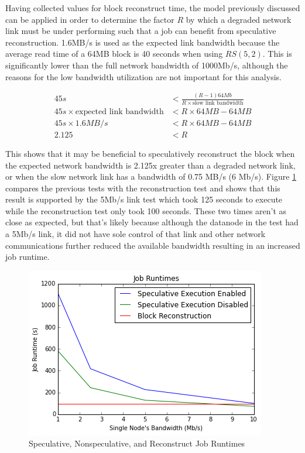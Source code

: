 \documentclass{ucetd}
\newcommand{\eqbegin}{\begin{equation*} \begin{aligned}}
\newcommand{\eqend}{\end{aligned} \end{equation*}}
\begin{document}
Having collected values for block reconstruct time, the model previously
discussed can be applied in order to determine the factor $R$ by which a
degraded network link must be under performing such that a job can benefit from
speculative reconstruction. 1.6MB/s is used as the expected link
bandwidth because the average read time of a 64MB block is 40 seconds when using
$RS(5,2)$. This is significantly lower than the full network bandwidth of
1000Mb/s, although the reasons for the low bandwidth utilization are not
important for this analysis.

\eqbegin
    45s &< \frac{(R - 1) 64Mb}{R \times \text{slow link bandwidth}} \\
    45s \times \text{expected link bandwidth}
    &< R \times 64 MB - 64MB \\
    45s \times 1.6 MB/s
    &< R \times 64 MB - 64MB \\
    2.125 &< R
\eqend

This shows that it may be beneficial to speculatively reconstruct the block when
the expected network bandwidth is 2.125x greater than a degraded network link,
or when the slow network link has a bandwidth of 0.75 MB/s (6 Mb/s). Figure
\ref{compare} compares the previous tests with the reconstruction test and shows
that this result is supported by the 5Mb/s link test which took 125 seconds to
execute while the reconstruction test only took 100 seconds. These two times
aren't as close as expected, but that's likely because although the datanode in
the test had a 5Mb/s link, it did not have sole control of that link and other
network communications further reduced the available bandwidth resulting in an
increased job runtime.

\begin{figure}[h]
    \centering
    \includegraphics[scale=0.7]{plots/spec_vs_recon.png}
    \caption{Speculative, Nonspeculative, and Reconstruct Job Runtimes}
    \label{compare}
\end{figure}
\end{document}
